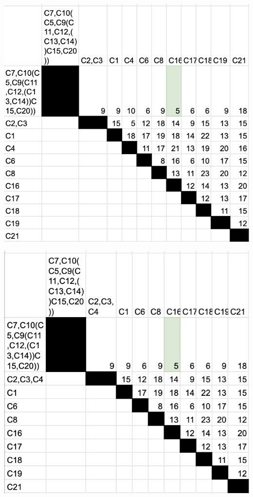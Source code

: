 \documentclass[a4paper,table,xcdraw]{article}
\begin{document}
\includegraphics[scale=0.8]{./img/carac8.png}

\includegraphics[scale=0.8]{./img/carac9.png}
\end{document}
